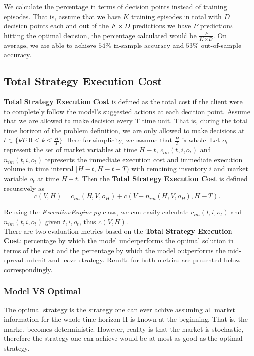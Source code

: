 \documentclass[12pt]{extarticle}
\begin{document}
\noindent We calculate the percentage in terms of decision points instead of training episodes. That is,
assume that we have $K$ training episodes in total with $D$ decision points each and
out of the $K \times D$ predictions we have $P$ predictions hitting the optimal decision,
the percentage calculated would be $\frac{P}{K \times D}$. On average, we are able to achieve
$54\%$ in-sample accuracy and $53\%$ out-of-sample accuracy.


\subsection{Total Strategy Execution Cost}
\textbf{Total Strategy Execution Cost} is defined as the total cost if the client were to
completely follow the model's suggested actions at each decition point. Assume that
we are allowed to make decision every T time unit. That is, during the total time horizon
of the problem definition, we are only allowed to make decisions at $t \in \{ kT: 0 \le k \le \frac{H}{T} \}$.
Here for simplicity, we assume that $\frac{H}{T}$ is whole. Let $o_t$ represent the set
of market variables at time $H - t$, $c_{im}(t, i, o_t)$ and $n_{im}(t, i, o_t)$ represents the immediate execution cost and
immediate execution volume in time interval $[H-t, H-t+T)$ with remaining inventory $i$ and market variable $o_t$ at time $H - t$.
Then the \textbf{Total Strategy Execution Cost} is defined recursively as
$$c(V, H) = c_{im}(H, V, o_H) + c(V - n_{im}(H, V, o_H), H - T).$$

\noindent Reusing the \textit{ExecutionEngine.py} class, we can easily calculate
$c_{im}(t, i, o_t)$ and $n_{im}(t, i, o_t)$ given $t, i, o_t$, thus $c(V, H)$.\\


\noindent There are two evaluation metrics based on the \textbf{Total Strategy Execution Cost}:
percentage by which the model underperforms the optimal solution in terms of the cost and the
percentage by which the model outperforms the mid-spread submit and leave strategy.
Results for both metrics are presented below correspondingly.

\subsubsection{Model VS Optimal}
The optimal strategy is the strategy one can ever achive assuming all market information for the whole
time horizon H is known at the beginning. That is, the market becomes deterministic.
However, reality is that the market is stochastic, therefore the strategy one can
achieve would be at most as good as the optimal strategy.\\
\end{document}
